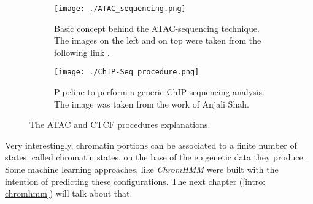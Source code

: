 \begin{figure}[H]
    \centering
    
    \begin{subfigure}{\textwidth}
      \texttt{[image: ./ATAC\_sequencing.png]}
      \caption{Basic concept behind the ATAC-sequencing technique. The images on the left and on top were taken from the following \href{https://www.activemotif.com/catalog/1233/atac-seq-service}{link}
      \cite{ATACSeqServicesEndtoEnd}.}
      \label{fig: ATAC-sequencing}
    \end{subfigure}
    \hfill
    \begin{subfigure}{0.50\textwidth}
      \texttt{[image: ./ChIP-Seq\_procedure.png]}
      \caption{Pipeline to perform a generic ChIP-sequencing analysis. The image was taken from the work of Anjali Shah\cite{shahChromatinImmunoprecipitationSequencing2009}.}
      \label{fig: CTCF ChIP-Seq}
    \end{subfigure}
  
    \caption{The ATAC and CTCF procedures explanations.}
\end{figure}

Very interestingly, chromatin portions can be associated to a finite number of states, called chromatin states, on the base of the epigenetic data they produce
\cite{ernstChromatinstateDiscoveryGenome2017}. 
Some machine learning approaches, like \textit{ChromHMM}
\cite{chilledhousevibesLearningChromatinStates2015} 
were built with the intention of predicting these configurations. The next chapter (\ref{intro: chromhmm}) will talk about that.
